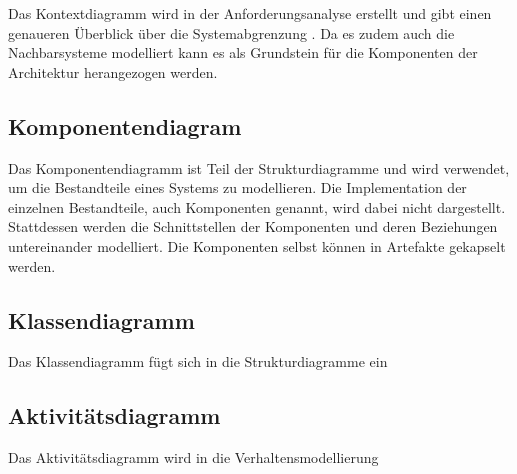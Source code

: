 Das Kontextdiagramm wird in der Anforderungsanalyse erstellt und gibt einen genaueren Überblick über die Systemabgrenzung \cite[S. 255]{glasklar}. Da es zudem auch die Nachbarsysteme modelliert kann es als Grundstein für die Komponenten der Architektur herangezogen werden.


\subsection{Komponentendiagram}
Das Komponentendiagramm ist Teil der Strukturdiagramme und wird verwendet, um die Bestandteile eines Systems zu modellieren. Die Implementation der einzelnen Bestandteile, auch Komponenten genannt, wird dabei nicht dargestellt. Stattdessen werden die Schnittstellen der Komponenten und deren Beziehungen untereinander modelliert. Die Komponenten selbst können in Artefakte gekapselt werden. \cite[S. 216]{glasklar}

\subsection{Klassendiagramm}
Das Klassendiagramm fügt sich in die Strukturdiagramme ein


\subsection{Aktivitätsdiagramm}

Das Aktivitätsdiagramm wird in die Verhaltensmodellierung